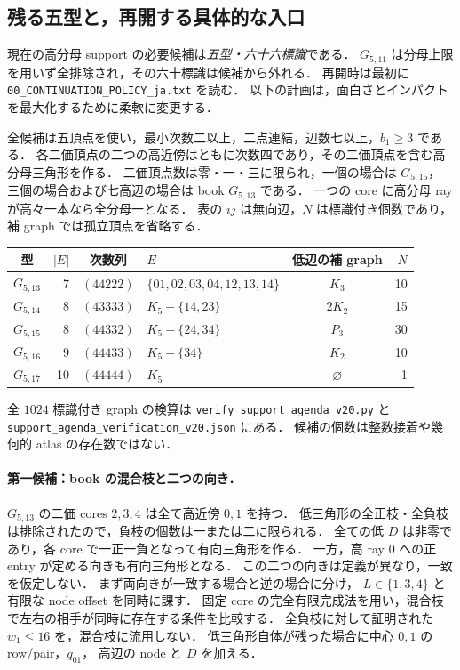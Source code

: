 \subsection{残る五型と，再開する具体的な入口}
\label{ns20:support-agenda}

現在の高分母 support の必要候補は\emph{五型・六十六標識}である．
$G_{5,11}$ は分母上限を用いず全排除され，その六十標識は候補から外れる．
再開時は最初に \nolinkurl{00_CONTINUATION_POLICY_ja.txt} を読む．
以下の計画は，面白さとインパクトを最大化するために柔軟に変更する．

全候補は五頂点を使い，最小次数二以上，二点連結，辺数七以上，$b_1\ge3$ である．
各二価頂点の二つの高近傍はともに次数四であり，その二価頂点を含む高分母三角形を作る．
二価頂点数は零・一・三に限られ，一個の場合は $G_{5,15}$，
三個の場合および七高辺の場合は book $G_{5,13}$ である．
一つの core に高分母 ray が高々一本なら全分母一となる．
表の $ij$ は無向辺，$N$ は標識付き個数であり，補 graph では孤立頂点を省略する．
\begin{center}
\footnotesize
\setlength{\tabcolsep}{4pt}
\begin{tabular}{crclcr}
型&$|E|$&次数列&$E$&低辺の補 graph&$N$\\\hline
$G_{5,13}$&7&$(44222)$&$\{01,02,03,04,12,13,14\}$&$K_3$&10\\
$G_{5,14}$&8&$(43333)$&$K_5-\{14,23\}$&$2K_2$&15\\
$G_{5,15}$&8&$(44332)$&$K_5-\{24,34\}$&$P_3$&30\\
$G_{5,16}$&9&$(44433)$&$K_5-\{34\}$&$K_2$&10\\
$G_{5,17}$&10&$(44444)$&$K_5$&$\varnothing$&1
\end{tabular}
\end{center}
全 $1024$ 標識付き graph の検算は
\nolinkurl{verify_support_agenda_v20.py} と
\nolinkurl{support_agenda_verification_v20.json} にある．
候補の個数は整数接着や幾何的 atlas の存在数ではない．

\paragraph{第一候補：book の混合枝と二つの向き．}
$G_{5,13}$ の二価 cores $2,3,4$ は全て高近傍 $0,1$ を持つ．
低三角形の全正枝・全負枝は排除されたので，負枝の個数は一または二に限られる．
全ての低 $D$ は非零であり，各 core で一正一負となって有向三角形を作る．
一方，高 ray $0$ への正 entry が定める向きも有向三角形となる．
この二つの向きは定義が異なり，一致を仮定しない．
まず両向きが一致する場合と逆の場合に分け，
$L\in\{1,3,4\}$ と有限な node offset を同時に課す．
固定 core の完全有限完成法を用い，混合枝で左右の相手が同時に存在する条件を比較する．
全負枝に対して証明された $w_1\le16$ を，混合枝に流用しない．
低三角形自体が残った場合に中心 $0,1$ の row/pair，$q_{01}$，
高辺の node と $D$ を加える．

